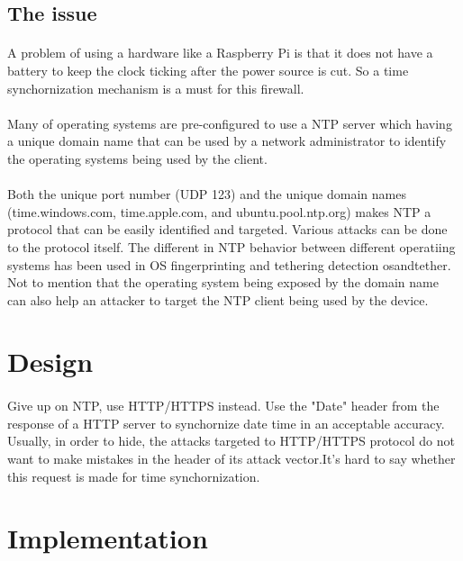 \documentclass[mscthesis]{usiinfthesis}
\begin{document}
\subsection{The issue}
\paragraph{}
A problem of using a hardware like a Raspberry Pi is that it does not have a battery to keep the clock ticking after the power source is cut. So a time synchornization mechanism is a must for this firewall.
\paragraph{}
Many of operating systems are pre-configured to use a NTP server which having a unique domain name that can be used by a network administrator to identify the operating systems being used by the client.
\paragraph{}
Both the unique port number (UDP 123) and the unique domain names (time.windows.com, time.apple.com, and ubuntu.pool.ntp.org) makes NTP a protocol that can be easily identified and targeted. Various attacks can be done to the protocol itself\citep{ntp:attack}. The different in NTP behavior between different operatiing systems has been used in OS fingerprinting and tethering detection {osandtether}. Not to mention that the operating system being exposed by the domain name can also help an attacker to target the NTP client being used by the device.

\section{Design}
\paragraph{}
Give up on NTP, use HTTP/HTTPS instead. Use the "Date" header from the response of a HTTP server to synchornize date time in an acceptable accuracy. Usually, in order to hide, the attacks targeted to HTTP/HTTPS protocol do not want to make mistakes in the header of its attack vector.It's hard to say whether this request is made for time synchornization.

\section{Implementation}
\end{document}
